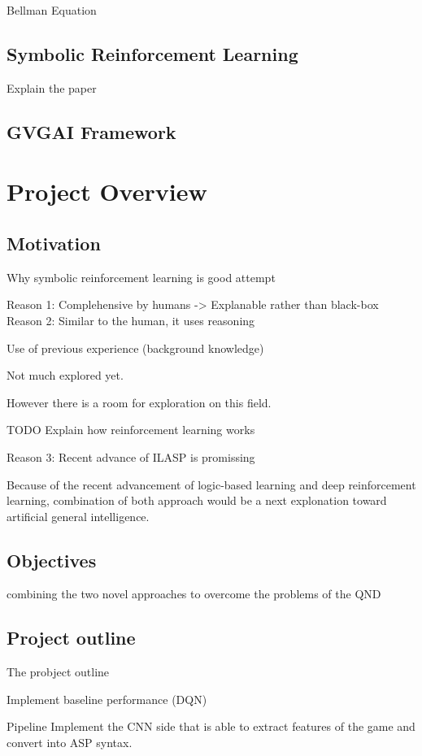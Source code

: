 \documentclass[12pt,twoside]{report}
\begin{document}
Bellman Equation

\section{Symbolic Reinforcement Learning}


Explain the paper
\section{GVGAI Framework}


\chapter{Project Overview}
\section{Motivation}

Why symbolic reinforcement learning is good attempt


Reason 1: Complehensive by humans -> Explanable rather than black-box
Reason 2: Similar to the human, it uses reasoning

Use of previous experience (background knowledge)

Not much explored yet.

However there is a room for exploration on this field.

TODO Explain how reinforcement learning works

Reason 3: Recent advance of ILASP is promissing

Because of the recent advancement of logic-based learning and deep reinforcement learning, combination of both approach would be a next explonation toward artificial general intelligence.


\section{Objectives}

combining the two novel approaches to overcome the problems of the QND

\section{Project outline}

The probject outline

Implement baseline performance (DQN)


Pipeline
Implement the CNN side that is able to extract features of the game and convert into ASP syntax.
\end{document}
